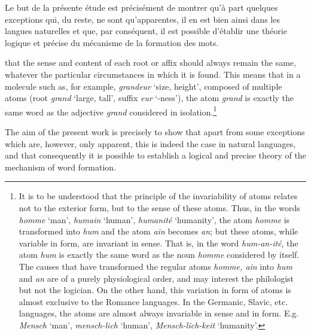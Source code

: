 \begin{sloppypar}
{  Le but de la présente étude est précisément de montrer qu’à part
  quelques exceptions qui, du reste, ne sont qu’apparentes, il en est
  bien ainsi dans les langues naturelles et que, par conséquent, il
  est possible d’établir une théorie logique et précise du mécanisme
  de la formation des mots.}  %
{\protect\noindent that the sense and content of each root or affix
  should always remain the same, whatever the particular circumstances
  in which it is found.  This means that in a molecule such as, for
  example, \emph{grandeur} `size, height', composed of multiple atoms
  (root \emph{grand} `large, tall', suffix \emph{eur} `-ness'), the
  atom \emph{grand} is exactly the same word as the adjective
  \emph{grand} considered in isolation.\footnote{It is to be
    understood that the principle of the invariability of atoms
    relates not to the exterior form, but to the sense of these
    atoms. Thus, in the words \emph{homme} `man', \emph{humain}
    `human', \emph{humanité} `humanity', the atom \emph{homme} is
    transformed into \emph{hum} and the atom \emph{ain} becomes
    \emph{an}; but these atoms, while variable in form, are invariant
    in sense.  That is, in the word \emph{hum-an-ité}, the atom
    \emph{hum} is exactly the same word as the noun \emph{homme}
    considered by itself. The causes that have transformed the regular
    atoms \emph{homme, ain} into \emph{hum} and \emph{an} are of a
    purely physiological order, and may interest the philologist but
    not the logician. On the other hand, this variation in form of
    atoms is almost exclusive to the Romance languages.  In the
    Germanic, Slavic, etc. languages, the atoms are almost always
    invariable in sense and in form. E.g. \emph{Mensch} `man',
    \emph{mensch-lich} `human', \emph{Mensch-lich-keit} `humanity'.}

  The aim of the present work is precisely to show that apart from
  some exceptions which are, however, only apparent, this is indeed
  the case in natural languages, and that consequently it is possible
  to establish a logical and precise theory of the mechanism of word
  formation.  }

\end{sloppypar}
